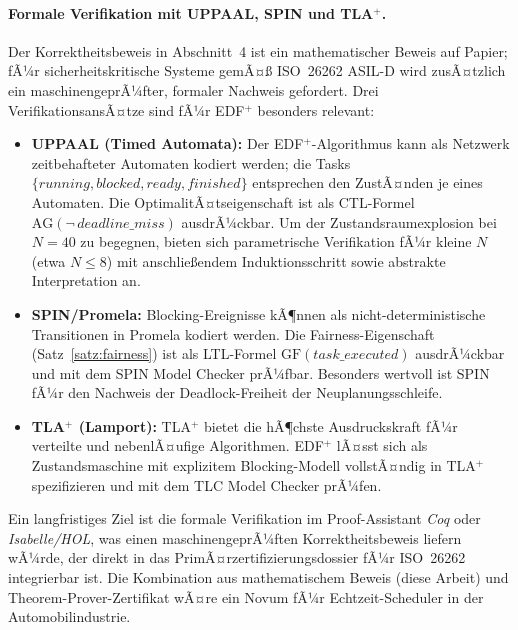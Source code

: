 ﻿\documentclass[a4paper,12pt]{article}
\theoremstyle{definition}
\begin{document}
	\paragraph{Formale Verifikation mit UPPAAL, SPIN und TLA$^+$.}
	Der Korrektheitsbeweis in Abschnitt~4 ist ein mathematischer Beweis auf Papier; fÃ¼r
	sicherheitskritische Systeme gemÃ¤\ss{} ISO~26262 ASIL-D wird zusÃ¤tzlich ein
	maschinengeprÃ¼fter, formaler Nachweis gefordert. Drei VerifikationsansÃ¤tze sind
	fÃ¼r EDF$^+$ besonders relevant:
	\begin{itemize}
		\item \textbf{UPPAAL (Timed Automata):} Der EDF$^+$-Algorithmus kann als Netzwerk
		      zeitbehafteter Automaten kodiert werden; die Tasks
		      $\{running, blocked, ready, finished\}$ entsprechen den ZustÃ¤nden je eines
		      Automaten. Die OptimalitÃ¤tseigenschaft ist als CTL-Formel
		      $\mathrm{AG}(\neg\, \textit{deadline\_miss})$ ausdrÃ¼ckbar.
		      Um der Zustandsraumexplosion bei $N = 40$ zu begegnen, bieten sich
		      parametrische Verifikation fÃ¼r kleine $N$ (etwa $N \le 8$) mit
		      anschlie\ss{}endem Induktionsschritt sowie abstrakte Interpretation an.
		\item \textbf{SPIN/Promela:} Blocking-Ereignisse kÃ¶nnen als nicht-deterministische
		      Transitionen in Promela kodiert werden. Die Fairness-Eigenschaft
		      (Satz~\ref{satz:fairness}) ist als LTL-Formel
		      $\mathrm{GF}(\textit{task\_executed})$ ausdrÃ¼ckbar und mit dem SPIN Model
		      Checker prÃ¼fbar. Besonders wertvoll ist SPIN fÃ¼r den Nachweis der
		      Deadlock-Freiheit der Neuplanungsschleife.
		\item \textbf{TLA$^+$ (Lamport):} TLA$^+$ bietet die hÃ¶chste Ausdruckskraft fÃ¼r
		      verteilte und nebenlÃ¤ufige Algorithmen. EDF$^+$ lÃ¤sst sich als
		      Zustandsmaschine mit explizitem Blocking-Modell vollstÃ¤ndig in TLA$^+$
		      spezifizieren und mit dem TLC Model Checker prÃ¼fen.
	\end{itemize}
	Ein langfristiges Ziel ist die formale Verifikation im Proof-Assistant \emph{Coq} oder
	\emph{Isabelle/HOL}, was einen maschinengeprÃ¼ften Korrektheitsbeweis liefern wÃ¼rde,
	der direkt in das PrimÃ¤rzertifizierungsdossier fÃ¼r ISO~26262 integrierbar ist.
	Die Kombination aus mathematischem Beweis (diese Arbeit) und Theorem-Prover-Zertifikat
	wÃ¤re ein Novum fÃ¼r Echtzeit-Scheduler in der Automobilindustrie.
\end{document}

